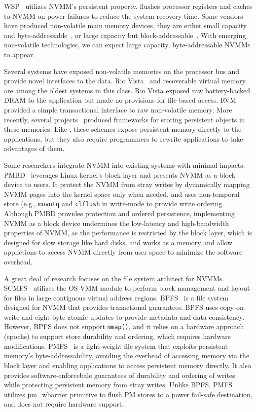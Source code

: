 WSP~\cite{WSP} utilizes NVMM's persistent property, flushes processor registers
and caches to NVMM on power failures to reduce the system recovery time.
Some vendors have produced non-volatile main memory devices, they are
either small capacity and byte-addressable~\cite{micron-nvdimm},
or large capacity but block-addressable~\cite{smart-system}.
With emerging non-volatile technologies, we can expect
large capacity, byte-addressable NVMMs to appear.

Several systems have exposed non-volatile memories on the processor bus
and provide novel interfaces to the data. Rio Vista~\cite{riovista} and
recoverable virtual memory~\cite{RVM} are among the oldest systems in this
class. Rio Vista exposed raw battery-backed DRAM to the application but made
no provisions for file-based access. RVM provided a simple transactional
interface to raw non-volatile memory.  More recently,
several projects~\cite{nvtm,
mnemosyne,hpnvdata} produced frameworks for storing persistent objects
in these memories.
Like \Chell{}, these schemes expose persistent memory directly
to the applications, but they also require programmers to rewrite applications
to take advantages of them.

Some researchers integrate NVMM into existing systems with minimal impacts.
PMBD~\cite{PMBD} leverages Linux kernel's block layer and presents NVMM as
a block device to users. It protect the NVMM from stray writes by dynamically
mapping NVMM pages into the kernel space only when needed, and uses non-temporal
store (e.g., \texttt{movntq} and \texttt{clflush} in write-mode to provide write
ordering.  Although PMBD provides protection and ordered persistence,
implementing NVMM as a block device undermines the low-latency and
high-bandwidth properties of NVMM, as the performance is restricted by the
block layer, which is designed for slow storage like hard disks. \DAChell{}
and \CChell{} works as a memory and allow applictions to access NVMM directly
from user space to minimize the software overhead.

A great deal of research focuses on the file system architect for NVMMs.
SCMFS~\cite{scmfs} utilizes the OS VMM module to perform  block
management and layout for files in large contiguous virtual address regions.
BPFS~\cite{BPFS} is a file system designed for NVMM that provides
tranactional guarantees. BPFS uses copy-on-write and eight-byte 
atomic updates to provide metadata and data consistency. However, BPFS does
not support \texttt{mmap()}, and it relies on a hardware approach (epochs)
to support store durability and ordering, which requires hardware
modifications.  PMFS~\cite{PMFS} is a light-weight
file system that exploits persistent memory's byte-addressability, avoiding the
overhead of accessing memory via the block layer and enabling applications to
access persistent memory directly.  It also provides software-enforcebale guarantees of durability
and ordering of writes while protecting persistent memory from stray writes.
Unlike BPFS, PMFS utilizes pm\_wbarrier primitive to flush PM stores to a power
fail-safe destination, and does not require hardware support.

